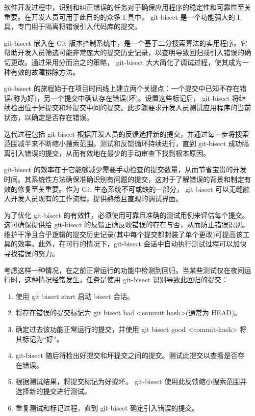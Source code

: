 软件开发过程中，识别和纠正错误的任务对于确保应用程序的稳定性和可靠性至关重要。在开发人员可用于此目的的众多工具中， git-bisect 是一个功能强大的工具，专门用于隔离将错误引入代码库的提交。

git-bisect 嵌入在 Git 版本控制系统中，是一个基于二分搜索算法的实用程序。它帮助开发人员筛选可能非常庞大的提交历史记录，以查明导致回归或引入错误的确切更改。通过采用分而治之的策略， git-bisect 大大简化了调试过程，使其成为一种有效的故障排除方法。

git-bisect 的旅程始于在项目时间线上建立两个关键点：一个提交中已知不存在错误(称为好)，另一个提交中确认存在错误(坏)。设置这些标记后， git-bisect 将继续检出位于好提交和坏提交中间的提交。此步骤要求开发人员测试应用程序的当前状态，以确定是否存在错误。

迭代过程包括 git-bisect 根据开发人员的反馈选择新的提交，并通过每一步将搜索范围减半来不断缩小搜索范围。测试和反馈循环持续进行，直到 git-bisect 成功隔离引入错误的提交，从而有效地在最少的手动审查下找到根本原因。

git-bisect 的效率在于它能够减少需要手动检查的提交数量，从而节省宝贵的开发时间。其系统性方法确保准确识别有问题的提交，这对于了解错误的背景和制定有效的修复至关重要。作为 Git 生态系统不可或缺的一部分， git-bisect 可以无缝融入开发人员现有的工作流程，提供熟悉且直观的调试界面。

为了优化 git-bisect 的有效性，必须使用可靠且准确的测试用例来评估每个提交。这可确保提供给 git-bisect 的反馈正确反映错误的存在与否，从而防止错误识别。维护干净且合乎逻辑的提交历史记录(其中每个提交都封装了单个更改)可提高该工具的效率。此外，在可行的情况下，git-bisect 会话中自动执行测试过程可以加快寻找错误的努力。

考虑这样一种情况，在之前正常运行的功能中检测到回归。当某些测试仅在夜间运行时，这种情况经常发生。任务是使用 git-bisect 识别导致此回归的提交：

\begin{enumerate}
\item
使用 git bisect start 启动 bisect 会话。

\item
将存在错误的提交标记为 git bisect bad <commit hash>(通常为 HEAD)。

\item
确定过去该功能正常运行的提交，并使用 git bisect good <commit-hash> 将其标记为“好”。

\item
git-bisect 随后将检出好提交和坏提交之间的提交。测试此提交以查看是否存在错误。

\item
根据测试结果，将提交标记为好或坏。 git-bisect 使用此反馈缩小搜索范围并选择新的提交进行测试。

\item
重复测试和标记过程，直到 git-bisect 确定引入错误的提交。
\end{enumerate}

